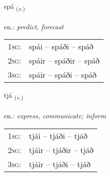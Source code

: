 \documentclass[frontgrid, backgrid]{flacards}\usepackage[]{graphicx}\usepackage[]{xcolor}
\begin{document}
\renewcommand{\flhead}{\vskip5pt \fboxsep=0pt {\small\bfseries\footnotesize Sagnorð | Verb}}
\renewcommand{\fcfoot}{\vskip5pt \fboxsep=0pt \hspace{2pt}{\small\bfseries\footnotesize 2K}}

\renewcommand{\blhead}{\vskip5pt {\small\bfseries\footnotesize Sagnorð | Verb }}
\renewcommand{\bcfoot}{\vskip5pt \hspace{2pt}{\small\bfseries\footnotesize 2K}}


{spá \small{\textsubscript{(\textit{v.})}} \\[1ex] %
\textphonetic{[spauː]} \\
en.: \emph{predict, forecast} \\  [2ex]
\renewcommand*{\arraystretch}{0.8}
\begin{tabular}{p{1cm}l}
\textsc{1sg}: & spái -- spáði -- spáð \\ 
\textsc{2sg}: & spáir -- spáðir -- spáð \\ 
\textsc{3sg}: & spáir -- spáði -- spáð \\ 
\end{tabular}
}

\renewcommand{\flhead}{\vskip5pt \fboxsep=0pt {\small\bfseries\footnotesize Sagnorð | Verb}}
\renewcommand{\fcfoot}{\vskip5pt \fboxsep=0pt \hspace{2pt}{\small\bfseries\footnotesize 2K}}

\renewcommand{\blhead}{\vskip5pt {\small\bfseries\footnotesize Sagnorð | Verb }}
\renewcommand{\bcfoot}{\vskip5pt \hspace{2pt}{\small\bfseries\footnotesize 2K}}


{tjá \small{\textsubscript{(\textit{v.})}} \\[1ex] %
\textphonetic{[tʰjauː]} \\
en.: \emph{express, communicate; inform} \\  [2ex]
\renewcommand*{\arraystretch}{0.8}
\begin{tabular}{p{1cm}l}
\textsc{1sg}: & tjái -- tjáði -- tjáð \\ 
\textsc{2sg}: & tjáir -- tjáðir -- tjáð \\ 
\textsc{3sg}: & tjáir -- tjáði -- tjáð \\ 
\end{tabular}
}
\end{document}
